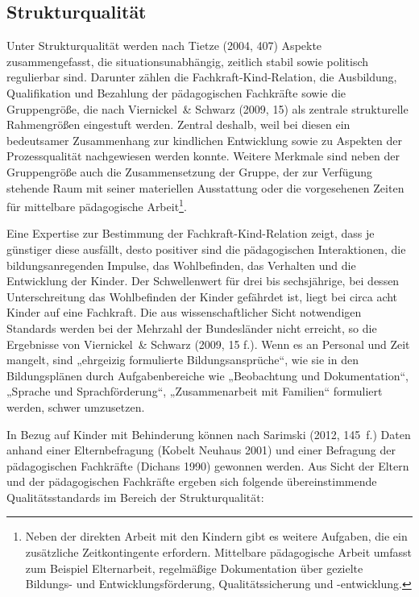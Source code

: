 \subsection{Strukturqualität}
\label{subsec:Strukturquali}
Unter Strukturqualität werden nach Tietze (2004, 407) Aspekte zusammengefasst, die situationsunabhängig, zeitlich stabil sowie politisch regulierbar sind. Darunter zählen die Fachkraft-Kind-Relation, die Ausbildung, Qualifikation und Bezahlung der pädagogischen Fachkräfte sowie die Gruppengröße, die nach Viernickel~\& Schwarz (2009, 15) als zentrale strukturelle Rahmengrößen eingestuft werden. Zentral deshalb, weil bei diesen ein bedeutsamer Zusammenhang zur kindlichen Entwicklung sowie zu Aspekten der Prozessqualität nachgewiesen werden konnte. Weitere Merkmale sind neben der Gruppengröße auch die Zusammensetzung der Gruppe, der zur Verfügung stehende Raum mit seiner materiellen Ausstattung oder die vorgesehenen Zeiten für mittelbare pädagogische Arbeit\footnote{Neben der direkten Arbeit mit den Kindern gibt es weitere Aufgaben, die ein zusätzliche Zeitkontingente erfordern. Mittelbare pädagogische Arbeit umfasst zum Beispiel Elternarbeit, regelmäßige Dokumentation über gezielte Bildungs- und Entwicklungsförderung, Qualitätssicherung und -entwicklung.}.

Eine Expertise zur Bestimmung der Fachkraft-Kind-Relation zeigt, dass je günstiger diese ausfällt, desto positiver sind die pädagogischen Interaktionen, die bildungsanregenden Impulse, das Wohlbefinden, das Verhalten und die Entwicklung der Kinder. Der Schwellenwert für drei bis sechsjährige, bei dessen Unterschreitung das Wohlbefinden der Kinder gefährdet ist, liegt bei circa acht Kinder auf eine Fachkraft. Die aus wissenschaftlicher Sicht notwendigen Standards werden bei der Mehrzahl der Bundesländer nicht erreicht, so die Ergebnisse von Viernickel~\& Schwarz (2009, 15 f.). Wenn es an Personal und Zeit mangelt, sind „ehrgeizig formulierte Bildungsansprüche“, wie sie in den Bildungsplänen durch Aufgabenbereiche wie „Beobachtung und Dokumentation“, „Sprache und Sprachförderung“, „Zusammenarbeit mit Familien“ formuliert werden, schwer umzusetzen.

In Bezug auf Kinder mit Behinderung können nach Sarimski (2012, 145~f.) Daten anhand einer Elternbefragung (Kobelt Neuhaus 2001) und einer Befragung der pädagogischen Fachkräfte (Dichans 1990) gewonnen werden. Aus Sicht der Eltern und der pädagogischen Fachkräfte ergeben sich folgende übereinstimmende Qualitätsstandards im Bereich der Strukturqualität:
 

